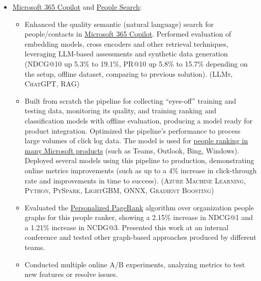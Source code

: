 \documentclass{article}
\begin{document}
\begin{itemize}

\item \href{https://www.microsoft.com/en-gb/microsoft-copilot/organizations}{Microsoft 365 Copilot} and \href{https://learn.microsoft.com/en-us/graph/search-concept-person}{People Search}:

  \begin{itemize}

  \item Enhanced the quality semantic (natural language) search for people/contacts in \href{https://www.microsoft.com/en-us/microsoft-365/copilot}{Microsoft 365 Copilot}. Performed evaluation of embedding models, cross encoders and other retrieval techniques, leveraging LLM-based assessments and synthetic data generation (NDCG@10 up 5.3\% to 19.1\%, PR@10 up 5.8\% to 15.7\% depending on the setup, offline dataset, comparing to previous solution). (\textsc{LLMs}, \textsc{ChatGPT}, \textsc{RAG})


  \item Built from scratch the pipeline for collecting ``eyes-off'' training and testing data, monitoring its quality, and training ranking and classification models with offline evaluation, producing a model ready for product integration. Optimized the pipeline's performance to process large volumes of click log data. The model is used for \href{https://www.youtube.com/watch?v=a6HO4ekmmjU}{people ranking in many Microsoft products} (such as Teams, Outlook, Bing, Windows). Deployed several models using this pipeline to production, demonstrating online metrics improvements (such as up to a 4\% increase in click-through rate and improvements in time to success). (\textsc{Azure Machine Learning}, \textsc{Python}, \textsc{PySpark}, \textsc{LightGBM}, \textsc{ONNX}, \textsc{Gradient Boosting})

  \item Evaluated the \href{https://www.cs.cornell.edu/~bindel/blurbs/edgeppr.html}{Personalized PageRank} algorithm over organization people graphs for this people ranker, showing a 2.15\% increase in NDCG@1 and a 1.21\% increase in NCDG@3. Presented this work at an internal conference and tested other graph-based approaches produced by different teams.

  \item Conducted multiple online A/B experiments, analyzing metrics to test new features or resolve issues.


\end{itemize}
\end{itemize}
\end{document}
